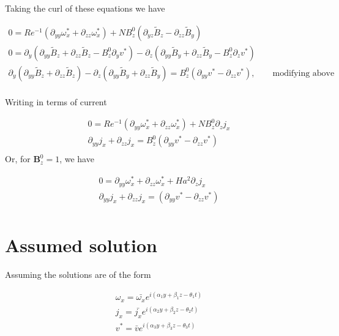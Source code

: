 \documentclass[11pt]{article}
\newcommand{\B}{\mathbf{B}}
\newcommand{\BT}{\tilde{B}}
\newcommand{\PD}{\partial}
\begin{document}
Taking the curl of these equations we have

\begin{equation}\begin{aligned}
0 = Re^{-1} (\PD_{yy} \omega_x^* + \PD_{zz} \omega_x^*) + N B_z^0 (\PD_{yz} \BT_z - \PD_{zz} \BT_y) \\
0 = \PD_y (\PD_{yy} \BT_z + \PD_{zz} \BT_z - B_z^0 \PD_y v^*) - \PD_z (\PD_{yy} \BT_y + \PD_{zz} \BT_y - B_z^0 \PD_z v^*) \\
\PD_y (\PD_{yy} \BT_z + \PD_{zz} \BT_z) - \PD_z (\PD_{yy} \BT_y + \PD_{zz} \BT_y) = B_z^0 (\PD_{yy} v^* - \PD_{zz} v^*), \qquad \text{modifying above} \\
\end{aligned}\end{equation}

Writing in terms of current

\begin{equation}\begin{aligned}
0 = Re^{-1} (\PD_{yy} \omega_x^* + \PD_{zz} \omega_x^*) + N B_z^0 \PD_{z} j_x \\
\PD_{yy} j_x + \PD_{zz} j_x = B_z^0 (\PD_{yy} v^* - \PD_{zz} v^*) \\
\end{aligned}\end{equation}
Or, for $\B_z^0 = 1$, we have

\begin{equation}\begin{aligned}
0 = \PD_{yy} \omega_x^* + \PD_{zz} \omega_x^* + Ha^2 \PD_{z} j_x \\
\PD_{yy} j_x + \PD_{zz} j_x = (\PD_{yy} v^* - \PD_{zz} v^*) \\
\end{aligned}\end{equation}

\section{Assumed solution}

Assuming the solutions are of the form

\begin{equation}\begin{aligned}
\omega_x = \bar{\omega_x} e^{i(\alpha_1 y + \beta_1 z - \theta_1 t)} \\
j_x      = \bar{j_x}      e^{i(\alpha_2 y + \beta_2 z - \theta_2 t)} \\
v^*      = \bar{v}        e^{i(\alpha_3 y + \beta_3 z - \theta_3 t)} \\
\end{aligned}\end{equation}
\end{document}
